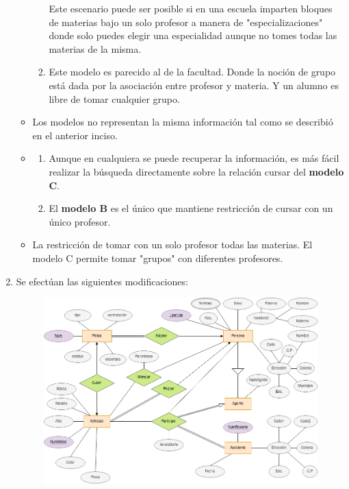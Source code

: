 \documentclass{exam}
\begin{document}
\begin{questions}
\begin{enumerate}[label=\roman*]
\begin{itemize}
\begin{enumerate}[label=\alph*]
	        Este escenario puede ser posible si en una escuela imparten bloques de materias bajo un solo profesor a manera de "especializaciones" donde solo puedes elegir una especialidad aunque no tomes todas las materias de la misma. 
	        
	        \item Este modelo es parecido al de la facultad. Donde la noción de grupo está dada por la asociación entre profesor y materia. Y un alumno es libre de tomar cualquier grupo.
	        
	        \end{enumerate}
	        
	        \item Los modelos no representan la misma información tal como se describió en el anterior inciso.
	        
	        \item \begin{enumerate}
	            \item Aunque en cualquiera se puede recuperar la información, es más fácil realizar la búsqueda directamente sobre la relación cursar del \textbf{modelo C}.
	            
	            \item El \textbf{modelo B} es el único que mantiene restricción de cursar con un único profesor.
	            
	        \end{enumerate}
	        
	        \item La restricción de tomar con un solo profesor todas las materias. El modelo C permite tomar "grupos" con diferentes profesores.
	        
	    \end{itemize}
	    
	    \item Se efectúan las siguientes modificaciones:
	    
	    \begin{figure}[h!]
	        \centering
	        \includegraphics[width=15cm]{imgCardenas/tarea2-2-ii.drawio.png}
	    \end{figure}
	    

\end{enumerate}
\end{questions}
\end{document}
